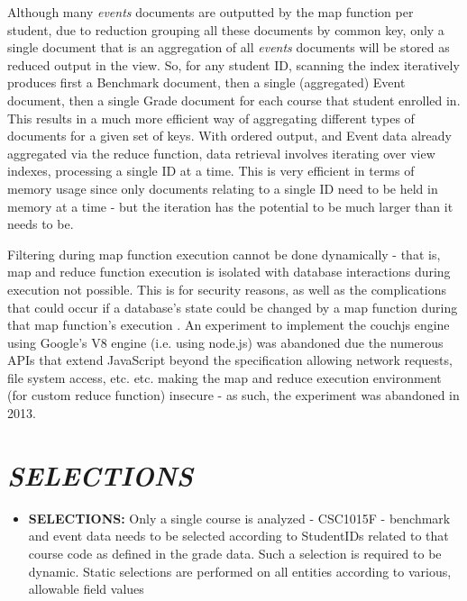 Although many \textit{events} documents are outputted by the map function per student, due to reduction grouping all these documents by common key, only a single document that is an aggregation of all \textit{events} documents will be stored as reduced output in the view. So, for any student ID, scanning the index iteratively produces first a Benchmark document, then a single (aggregated) Event document, then a single Grade document for each course that student enrolled in. This results in a much more efficient way of aggregating different types of documents for a given set of keys. With ordered output, and Event data already aggregated via the reduce function, data retrieval involves iterating over view indexes, processing a single ID at a time. This is very efficient in terms of memory usage since only documents relating to a single ID need to be held in memory at a time - but the iteration has the potential to be much larger than it needs to be.

Filtering during map function execution cannot be done dynamically - that is, map and reduce function execution is isolated with database interactions during execution not possible. This is for security reasons, as well as the complications that could occur if a database's state could be changed by a map function during that map function's execution \cite{slack28Feb}. An experiment to implement the couchjs engine using Google's V8 engine (i.e. using node.js) was abandoned due the numerous APIs that extend JavaScript beyond the specification allowing network requests, file system access, etc. etc. \cite{v8couchjs, slack28Feb} making the map and reduce execution environment (for custom reduce function) insecure - as such, the experiment was abandoned in 2013.







\section{\textit{SELECTIONS}}
\begin{itemize}
    \item \textbf{SELECTIONS:} Only a single course is analyzed - CSC1015F - benchmark and event data needs to be selected according to StudentIDs related to that course code as defined in the grade data. Such a selection is required to be dynamic. Static selections are performed on all entities according to various, allowable field values
\end{itemize}






















